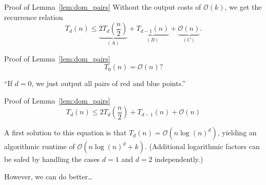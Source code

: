 \begin{frame}{Proof of Lemma~\ref{lem:dom_pairs}}
    Without the output costs of $\mathcal{O}\left( k \right)$, we get the recurrence relation
    \[
        T_d(n) \leq \underbrace{2 T_d\left( \frac{n}{2} \right)}_{(A)} + \underbrace{T_{d - 1}(n)}_{(B)} + \underbrace{\mathcal{O}(n)}_{(C)}.
    \]



\end{frame}

\begin{frame}{Proof of Lemma~\ref{lem:dom_pairs}}
    \[
        T_0(n) = \mathcal{O}\left( n \right)?
    \]

    ``If $d = 0$, we just output all pairs of red and blue points.''



\end{frame}

\begin{frame}{Proof of Lemma~\ref{lem:dom_pairs}}
    \[
        T_d(n) \leq 2 T_d\left( \frac{n}{2} \right) + T_{d - 1}(n) + \mathcal{O}(n)
    \]

    A first solution to this equation is that $T_d(n) = \mathcal{O}\left( n {\log(n)}^d \right)$, yielding an algorithmic runtime of $\mathcal{O}\left( n {\log(n)}^d + k \right)$. (Additional logarithmic factors can be safed by handling the cases $d = 1$ and $d = 2$ independently.\footnotemark[1]{})

    However, we can do better\dots
\end{frame}

